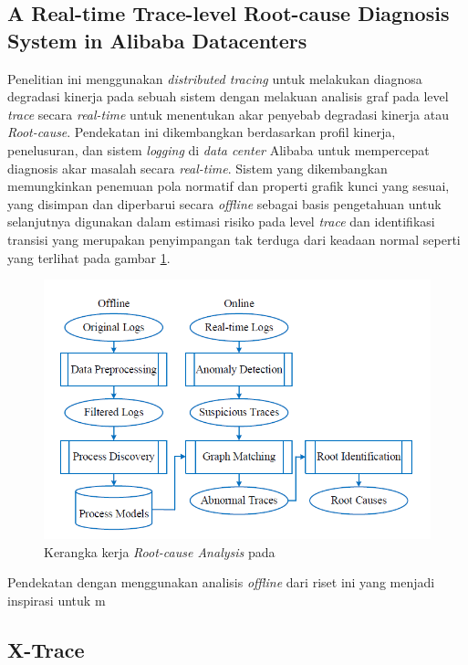 \subsection{A Real-time Trace-level Root-cause Diagnosis System in Alibaba Datacenters}
Penelitian ini \citep{rca-alibaba} menggunakan \textit{distributed tracing} untuk melakukan diagnosa degradasi kinerja pada sebuah sistem dengan melakuan analisis graf pada level \textit{trace} secara \textit{real-time} untuk menentukan akar penyebab degradasi kinerja atau \textit{Root-cause}. Pendekatan ini dikembangkan berdasarkan profil kinerja, penelusuran, dan sistem \textit{logging} di \textit{data center} Alibaba untuk mempercepat diagnosis akar masalah secara \textit{real-time}. Sistem yang dikembangkan memungkinkan penemuan pola normatif dan properti grafik kunci yang sesuai, yang disimpan dan diperbarui secara \textit{offline} sebagai basis pengetahuan untuk selanjutnya digunakan dalam estimasi risiko pada level \textit{trace} dan identifikasi transisi yang merupakan penyimpangan tak terduga dari keadaan normal seperti yang terlihat pada gambar \ref{ch2-rca-framwork}.
\begin{figure}[htb]
	\centering
	\includegraphics[width=1\textwidth]{resources/ch2/rca-framework.png}
	\caption{Kerangka kerja \textit{Root-cause Analysis} pada \citep{rca-alibaba}}
	\label{ch2-rca-framwork}
\end{figure}


Pendekatan dengan menggunakan analisis \textit{offline} dari riset ini yang menjadi inspirasi untuk m


\subsection{X-Trace}

